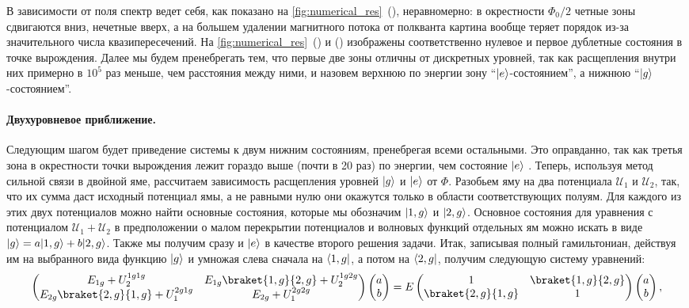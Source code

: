 \documentclass[12pt, twoside]{report}
\DeclarePairedDelimiter\bra{\langle}{\rvert}
\DeclarePairedDelimiter\ket{\lvert}{\rangle}
\numberwithin{equation}{section}
\numberwithin{figure}{section}
\begin{document}
В зависимости от поля спектр ведет себя, как показано на \autoref{fig:numerical_res}~(), неравномерно: в окрестности $\Phi_0/2$ четные зоны сдвигаются вниз, нечетные вверх, а на большем удалении магнитного потока от полкванта картина вообще теряет порядок из-за значительного числа квазипересечений. На \autoref{fig:numerical_res}~() и () изображены соответственно нулевое и первое дублетные состояния в точке вырождения.  Далее мы будем пренебрегать тем, что первые две зоны отличны от дискретных уровней, так как расщепления внутри них примерно в $10^5$ раз меньше, чем расстояния между ними, и назовем верхнюю по энергии зону ``$\ket{e}$-состоянием'', а нижнюю ``$\ket{g}$-состоянием''.

\paragraph{Двухуровневое приближение.} Следующим шагом будет приведение системы к двум нижним состояниям, пренебрегая всеми остальными. Это оправданно, так как третья зона в окрестности точки вырождения лежит гораздо выше (почти в 20 раз) по энергии, чем состояние $\ket{e}$ . Теперь, используя метод сильной связи в двойной яме, рассчитаем зависимость расщепления уровней $\ket{g}$ и $\ket{e}$ от $\Phi$. Разобьем яму на два потенциала $\mathcal{U}_1$ и $\mathcal{U}_2$, так, что их сумма даст исходный потенциал ямы, а не равными нулю они окажутся только в области соответствующих полуям. Для каждого из этих двух потенциалов можно найти основные состояния, которые мы обозначим $\ket{1, g}$ и $\ket{2, g}$. Основное состояния для уравнения с потенциалом $\mathcal{U}_1+\mathcal{U}_2$ в предположении о малом перекрытии потенциалов и волновых функций отдельных ям можно искать в виде $\ket{g} = a\ket{1, g} + b\ket{2, g}$. Также мы получим сразу и $\ket{e}$ в качестве второго решения задачи. Итак, записывая полный гамильтониан, действуя им на выбранного вида функцию $\ket{g}$ и умножая слева сначала на $\bra{1, g}$, а потом на $\bra{2, g}$, получим следующую систему уравнений:
\begin{align*}
\left(\begin{matrix}
E_{1g}+U_2^{1g1g} & E_{1g}\braket{1,g}{2,g} + U_2^{1g2g}\\ 
E_{2g}\braket{2,g}{1,g} + U_1^{2g1g} & E_{2g} + U_1^{2g2g}
\end{matrix}\right) 
\left(\begin{matrix}
a \\b 
\end{matrix}\right) = 
E\left(\begin{matrix}
1 & \braket{1,g}{2,g} \\
\braket{2,g}{1,g} & 1
\end{matrix}\right)
\left(\begin{matrix}
a \\b 
\end{matrix}\right),
\end{align*}
\end{document}
